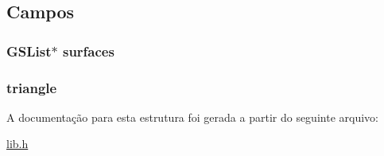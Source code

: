 \subsection{Campos}
\subsubsection[{\texorpdfstring{surfaces}{surfaces}}]{\setlength{\rightskip}{0pt plus 5cm}G\+S\+List$\ast$ surfaces}\hypertarget{structdbFace_a6018f19ec73ee7aa43998a9d763c635f}{}\label{structdbFace_a6018f19ec73ee7aa43998a9d763c635f}
\subsubsection[{\texorpdfstring{triangle}{triangle}}]{ triangle}\hypertarget{structdbFace_a1600f7dbf1d0654be251c20dc049837c}{}\label{structdbFace_a1600f7dbf1d0654be251c20dc049837c}


A documentação para esta estrutura foi gerada a partir do seguinte arquivo\+:\begin{DoxyCompactItemize}
\item 
\hyperlink{lib_8h}{lib.\+h}\end{DoxyCompactItemize}
